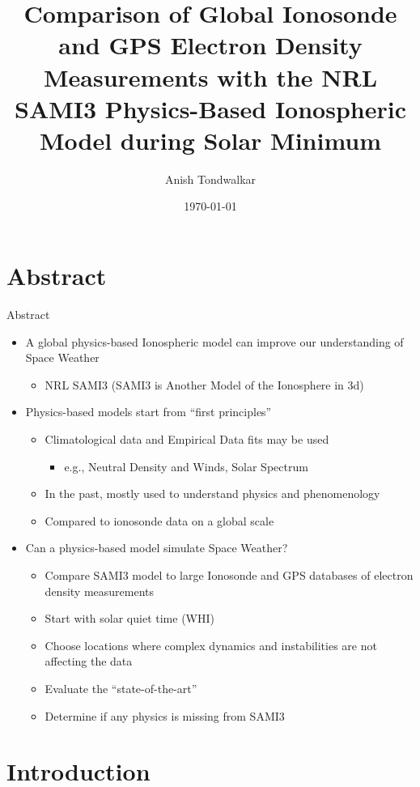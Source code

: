 \documentclass{beamer}
\title[Comparison of SAMI3 with Ionospheric Data]
{Comparison of Global Ionosonde and GPS Electron Density Measurements with the NRL SAMI3 Physics-Based Ionospheric Model during Solar Minimum}
\author{Anish Tondwalkar}
\date{\today}
\begin{document}
\maketitle
\section{Abstract}
\begin{frame}{Abstract}
  \begin{itemize}
    \item A global physics-based Ionospheric model can improve our understanding of Space Weather
      \begin{itemize}
	\item NRL SAMI3 (SAMI3 is Another Model of the Ionosphere in 3d)
      \end{itemize}
    \item Physics-based models start from “first principles”
      \begin{itemize}
	\item Climatological data and Empirical Data fits may be used
	  \begin{itemize}
	    \item e.g., Neutral Density and Winds, Solar Spectrum
	  \end{itemize}
	\item In the past, mostly used to understand physics and phenomenology
	\item Compared to ionosonde data on a global scale
      \end{itemize}
    \item Can a physics-based model simulate Space Weather? 
      \begin{itemize}
	\item Compare SAMI3 model to large Ionosonde and GPS databases of electron density measurements
	\item Start with solar quiet time (WHI)
	\item Choose locations where complex dynamics and instabilities are not affecting the data
	\item Evaluate the ``state-of-the-art''
	\item Determine if any physics is missing from SAMI3
      \end{itemize}
  \end{itemize}
\end{frame}

\section{Introduction}
\end{document}
